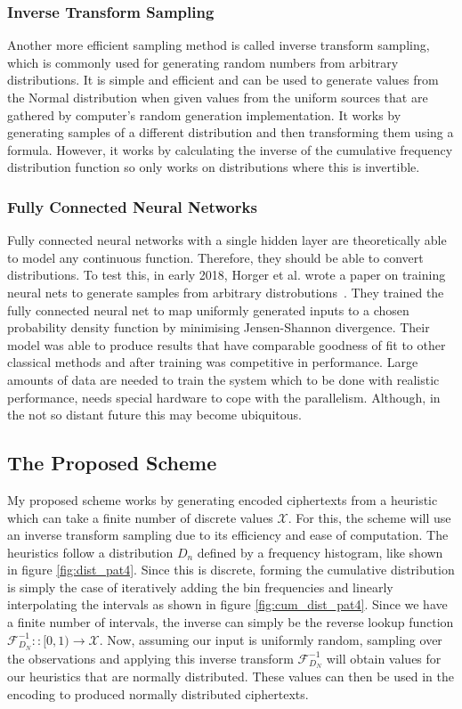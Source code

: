 \documentclass[ %
                    author={Samuel Russell},
                supervisor={Prof. Bogdan Warinschi},
                    degree={MEng},
                     title={Innocuous Ciphertexts},
                  subtitle={The DE-CENSOR Scheme},
                      type={research},
                      year={2018} ]{dissertation}
\begin{document}
\subsubsection{Inverse Transform Sampling}

Another more efficient sampling method is called inverse transform sampling, which is commonly used for generating random numbers from arbitrary distributions.
It is simple and efficient and can be used to generate values from the Normal distribution when given values from the uniform sources that are gathered by computer's random generation implementation.
It works by generating samples of a different distribution and then transforming them using a formula.
However, it works by calculating the inverse of the cumulative frequency distribution function so only works on distributions where this is invertible.

\subsubsection{Fully Connected Neural Networks}

Fully connected neural networks with a single hidden layer are theoretically able to model any continuous function.
Therefore, they should be able to convert distributions.
To test this, in early 2018, Horger et al. wrote a paper on training neural nets to generate samples from arbitrary distrobutions~\cite{deepl}.
They trained the fully connected neural net to map uniformly generated inputs to a chosen probability density function by minimising Jensen-Shannon divergence.
Their model was able to produce results that have comparable goodness of fit to other classical methods and after training was competitive in performance.
Large amounts of data are needed to train the system which to be done with realistic performance, needs special hardware to cope with the parallelism. Although, in the not so distant future this may become ubiquitous. 

\subsection{The Proposed Scheme}

My proposed scheme works by generating encoded ciphertexts from a heuristic which can take a finite number of discrete values $\mathcal{X}$. For this, the scheme will use an inverse transform sampling due to its efficiency and ease of computation.
The heuristics follow a distribution $D_n$ defined by a frequency histogram, like shown in figure \ref{fig:dist_pat4}.
Since this is discrete, forming the cumulative distribution is simply the case of iteratively adding the bin frequencies and linearly interpolating the intervals as shown in figure \ref{fig:cum_dist_pat4}.
Since we have a finite number of intervals, the inverse can simply be the reverse lookup function $\mathcal{F}^{-1}_{D_N} :: [0,1) \rightarrow \mathcal{X}$.
Now, assuming our input is uniformly random, sampling over the observations and applying this inverse transform $\mathcal{F}^{-1}_{D_N}$ will obtain values for our heuristics that are normally distributed.
These values can then be used in the encoding to produced normally distributed ciphertexts.
\end{document}
